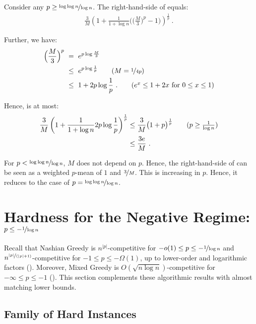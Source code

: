 \documentclass[11pt,letterpaper]{article}
\begin{document}
Consider any $p \ge \nicefrac{\log\log n}{\log n}$.
The right-hand-side of  equals:
\begin{align*}
	\frac{3}{M} \left( 1 + \frac{1}{1+\log n} \Big( \Big( \frac{M}{3} \Big)^p - 1 \Big) \right)^{\frac{1}{p}}
	~.
\end{align*}

Further, we have:
\begin{align*}
	\Big( \frac{M}{3} \Big)^p 
	&
	~=~ e^{p \log \frac{M}{3}} \\
	&
	~\le~ e^{p \log \frac{1}{p}} 
	\tag{$M = \nicefrac{1}{4p}$} \\
	&
	~\le~ 1 + 2p\log \frac{1}{p}
	~.
	\tag{$e^x \le 1+2x$ for $0 \le x \le 1$}
\end{align*}

Hence,  is at most:
\begin{align*}
	\frac{3}{M} \left( 1 + \frac{1}{1+\log n} 2p\log \frac{1}{p} \right)^{\frac{1}{p}}
	&
	\le
	\frac{3}{M} \big( 1 + p \big)^\frac{1}{p} 
	\tag{$p \ge \frac{1}{\log n}$} \\
	&
	\le \frac{3e}{M}
	~.
\end{align*}


For $p < \nicefrac{\log\log n}{\log n}$, $M$ does not depend on $p$.
Hence, the right-hand-side of  can be seen as a weighted $p$-mean of $1$ and $\nicefrac{3}{M}$.
This is increasing in $p$.
Hence, it reduces to the case of $p = \nicefrac{\log\log n}{\log n}$.








 \section[Hardness for the Negative Regime]{Hardness for the Negative Regime: $p \le - \nicefrac{1}{\log n}$}

Recall that Nashian Greedy is $n^{|p|}$-competitive for $-o(1) \le p \le -\nicefrac{1}{\log n}$ and $n^{\nicefrac{|p|}{(|p|+1)}}$-competitive for $-1 \le p \le -\Omega(1)$, up to lower-order and logarithmic factors ().
Moreover, Mixed Greedy is $O(\sqrt{n \log n})$-competitive for $-\infty \le p \le -1$ ().
This section complements these algorithmic results with almost matching lower bounds.

\subsection{Family of Hard Instances}
\end{document}

